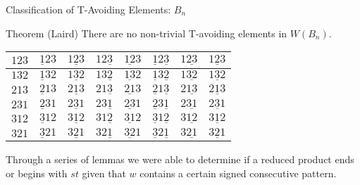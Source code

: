 \documentclass[9pt,handout]{beamer}
\begin{document}
\begin{frame}{Classification of T-Avoiding Elements: $B_n$}

\begin{block}{Theorem (Laird)}
	There are no non-trivial T-avoiding elements in $W(B_n)$.
\end{block}

\pause

\begin{center}
\begin{tabular}{|l|l|l|l|l|l|l|l|}
\hline
\cellcolor{blue!60}$123$ & \cellcolor{orange2!90}$\underline{1}23$ & \cellcolor{brown!90}$1\underline{2}3$ & \cellcolor{red!55}$12\underline{3}$ & \cellcolor{brown!90}$\underline{12}3$ & \cellcolor{red!55}$\underline{1}2\underline{3}$ & \cellcolor{turq!90}$1\underline{23}$ & \cellcolor{turq!90}$\underline{123}$ \\
\hline
\cellcolor{blue!60}$132$ & \cellcolor{orange2!90}$\underline{1}32$ & \cellcolor{brown!90}$1\underline{3}2$ & \cellcolor{red!55}$13\underline{2}$ & \cellcolor{brown!90}$\underline{13}2$ & \cellcolor{red!55}$\underline{1}3\underline{2}$ & \cellcolor{ggreen!90}$1\underline{32}$ & \cellcolor{ggreen!90}$\underline{132}$ \\
\hline
\cellcolor{blue!60}$213$ & \cellcolor{yellow!90}$\underline{2}13$ & \cellcolor{brown!90}$2\underline{1}3$ & \cellcolor{turq!90}$21\underline{3}$ & \cellcolor{yellow!90}$\underline{21}3$ & \cellcolor{red!55}$\underline{2}1\underline{3}$ & \cellcolor{turq!90}$2\underline{13}$ & \cellcolor{red!55}$\underline{213}$ \\
\hline
\cellcolor{red!55}$231$ & \cellcolor{purple2!90}$\underline{2}31$ & \cellcolor{ggreen!90}$2\underline{3}1$ & \cellcolor{red!55}$23\underline{1}$ & \cellcolor{brown!90}$\underline{23}1$ & \cellcolor{purple2!90}$\underline{2}3\underline{1}$ & \cellcolor{ggreen!90}$2\underline{31}$ & \cellcolor{brown!90}$\underline{231}$ \\
\hline
\cellcolor{ggreen!90}$312$ & \cellcolor{yellow!90}$\underline{3}12$ & \cellcolor{ggreen!90}$3\underline{1}2$ &\cellcolor{turq!90}$31\underline{2}$ & \cellcolor{yellow!90}$\underline{31}2$ & \cellcolor{yellow!90}$\underline{3}1\underline{2}$ & \cellcolor{turq!90}$3\underline{12}$ & \cellcolor{yellow!90}$\underline{312}$ \\
\hline
\cellcolor{turq!90}$321$ & \cellcolor{yellow!90}$\underline{3}21$ & \cellcolor{ggreen!90}$3\underline{2}1$ & \cellcolor{turq!90}$32\underline{1}$ & \cellcolor{yellow!90}$\underline{32}1$ & \cellcolor{yellow!90}$\underline{3}2\underline{1}$ & \cellcolor{ggreen!90}$3\underline{21}$ & \cellcolor{yellow!90}$\underline{321}$\\
\hline
\end{tabular}
\end{center}

Through a series of lemmas we were able to determine if a reduced product ends or begins with $st$ given that $w$ contains a certain signed consecutive pattern.

\end{frame}
\end{document}
